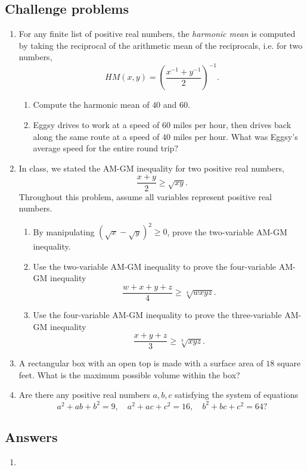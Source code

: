 \subsection{Challenge problems}

\begin{enumerate}[resume]
\item For any finite list of positive real numbers, the \emph{harmonic mean} is computed by taking the reciprocal of the arithmetic mean of the reciprocals, i.e. for two numbers,
\begin{equation*}
HM(x,y) = \left(\frac{x^{-1} + y^{-1}}{2}\right)^{-1}.
\end{equation*}
\begin{enumerate}
\item Compute the harmonic mean of $40$ and $60$.
\item Eggsy drives to work at a speed of $60$ miles per hour, then drives back along the same route at a speed of $40$ miles per hour. What was Eggsy's average speed for the entire round trip?
\end{enumerate}
\item In class, we stated the AM-GM inequality for two positive real numbers,
\begin{equation*}
\frac{x + y}{2}\geq\sqrt{xy}.
\end{equation*}
Throughout this problem, assume all variables represent positive real numbers.
\begin{enumerate}
\item By manipulating $\left(\sqrt{x} - \sqrt{y}\right)^2\geq 0$, prove the two-variable AM-GM inequality.
\item Use the two-variable AM-GM inequality to prove the four-variable AM-GM inequality
\begin{equation*}
\frac{w + x + y + z}{4}\geq\sqrt[4]{wxyz}.
\end{equation*}
\item Use the four-variable AM-GM inequality to prove the three-variable AM-GM inequality
\begin{equation*}
\frac{x + y + z}{3}\geq\sqrt[3]{xyz}.
\end{equation*}
\end{enumerate}
\item A rectangular box with an open top is made with a surface area of $18$ square feet. What is the maximum possible volume within the box?
\item Are there any positive real numbers $a,b,c$ satisfying the system of equations
\begin{equation*}
a^2 + ab + b^2 = 9,\quad a^2 + ac + c^2 = 16,\quad b^2 + bc + c^2 = 64?
\end{equation*}
\end{enumerate}


\newpage
\subsection{Answers}

\begin{enumerate}
\item 
\end{enumerate}